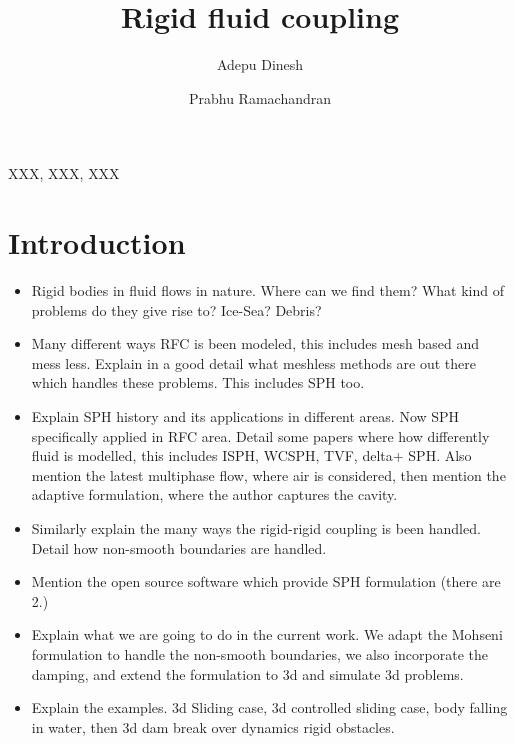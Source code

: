 \documentclass[preprint,12pt]{elsarticle}
\begin{document}
\begin{frontmatter}

  \title{Rigid fluid coupling}
  \author[IITB]{Adepu Dinesh }
   \author[IITB]{Prabhu Ramachandran}
   \address[IITB]{Department of Aerospace
    Engineering, Indian Institute of Technology Bombay, Powai, Mumbai 400076}


\begin{abstract}
\end{abstract}

\begin{keyword}
{XXX}, {XXX}, {XXX}


\end{keyword}

\end{frontmatter}


\section{Introduction}
\label{sec:intro}
\begin{itemize}
\item Rigid bodies in fluid flows in nature. Where can we find them? What kind
  of problems do they give rise to? Ice-Sea? Debris?
\item Many different ways RFC is been modeled, this includes mesh based and
  mess less. Explain in a good detail what meshless methods are out there
  which handles these problems. This includes SPH too.
\item Explain SPH history and its applications in different areas. Now SPH
  specifically applied in RFC area. Detail some papers where how differently
  fluid is modelled, this includes ISPH, WCSPH, TVF, delta+ SPH. Also mention
  the latest multiphase flow, where air is considered, then mention the
  adaptive formulation, where the author captures the cavity.
\item Similarly explain the many ways the rigid-rigid coupling is been
  handled. Detail how non-smooth boundaries are handled.
\item Mention the open source software which provide SPH formulation (there are 2.)
\item Explain what we are going to do in the current work. We adapt the
  Mohseni formulation to handle the non-smooth boundaries, we also incorporate
  the damping, and extend the formulation to 3d and simulate 3d problems.
\item Explain the examples. 3d Sliding case, 3d controlled sliding case, body
  falling in water, then 3d dam break over dynamics rigid obstacles.
\end{itemize}
\end{document}

